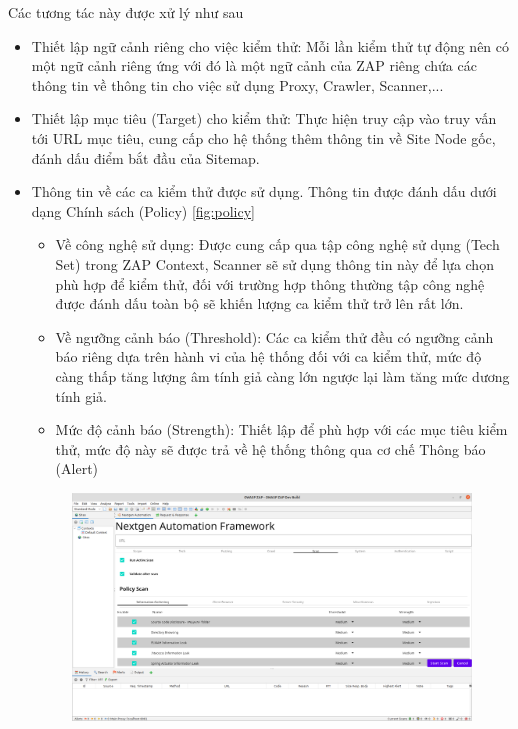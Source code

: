 \documentclass[./../main.tex]{subfiles}
\begin{document}
Các tương tác này được xử lý như sau
\begin{itemize}
	\item Thiết lập ngữ cảnh riêng cho việc kiểm thử: Mỗi lần kiểm
	      thử tự động nên có một ngữ cảnh riêng ứng với đó là một ngữ cảnh
	      của ZAP riêng chứa các thông tin về thông tin cho việc sử dụng
	      Proxy, Crawler, Scanner,...
	\item Thiết lập mục tiêu (Target) cho kiểm thử: Thực hiện truy cập
	      vào truy vấn tới URL mục tiêu, cung cấp cho hệ thống thêm thông tin
	      về Site Node gốc, đánh dấu điểm bắt đầu của Sitemap.
	\item Thông tin về các ca kiểm thử được sử dụng. Thông tin được
	      đánh dấu dưới dạng Chính sách (Policy) \ref{fig:policy}
	      \begin{itemize}
		      \item Về công nghệ sử dụng: Được cung cấp qua tập công
		            nghệ sử dụng (Tech Set) trong ZAP Context, Scanner sẽ
		            sử dụng thông tin này để lựa chọn phù hợp để kiểm thử,
		            đối với trường hợp thông thường tập công nghệ được
		            đánh dấu toàn bộ sẽ khiến lượng ca kiểm thử trở lên rất lớn.
		      \item Về ngưỡng cảnh báo (Threshold): Các ca kiểm thử đều có ngưỡng
		            cảnh báo riêng dựa trên hành vi của hệ thống đối với ca
		            kiểm thử, mức độ càng thấp tăng lượng âm tính giả càng
		            lớn ngược lại làm tăng mức dương tính giả.
		      \item Mức độ cảnh báo (Strength): Thiết lập để phù hợp với các mục
		            tiêu kiểm thử, mức độ này sẽ được trả về hệ thống thông
		            qua cơ chế Thông báo (Alert)
	      \end{itemize}
	      \begin{figure}[ht!]
		      \includegraphics[width=\linewidth]{./images/policy.png}

\end{figure}
\end{itemize}
\end{document}
